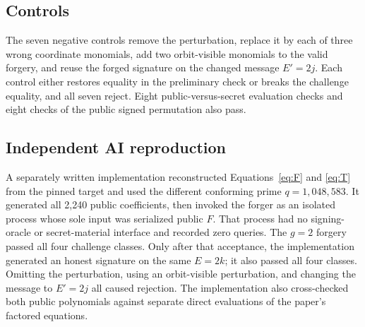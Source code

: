\documentclass[10pt,a4paper]{article}
\begin{document}
\subsection{Controls}

The seven negative controls remove the perturbation, replace it by each of
three wrong coordinate monomials, add two orbit-visible monomials to the valid
forgery, and reuse the forged signature on the changed message $E'=2j$.  Each
control either restores equality in the preliminary check or breaks the
challenge equality, and all seven reject.  Eight public-versus-secret
evaluation checks and eight checks of the public signed permutation also pass.

\subsection{Independent AI reproduction}

A separately written implementation reconstructed Equations~\eqref{eq:F} and
\eqref{eq:T} from the pinned target and used the different conforming prime
$q=1{,}048{,}583$.  It generated all 2,240 public coefficients, then invoked
the forger as an isolated process whose sole input was serialized public $F$.
That process had no signing-oracle or secret-material interface and recorded
zero queries.  The $g=2$ forgery passed all four challenge classes.  Only
after that acceptance, the implementation generated an honest signature on
the same $E=2k$; it also passed all four classes.  Omitting the perturbation,
using an orbit-visible perturbation, and changing the message to $E'=2j$ all
caused rejection.  The implementation also cross-checked both public
polynomials against separate direct evaluations of the paper's factored
equations.
\end{document}
